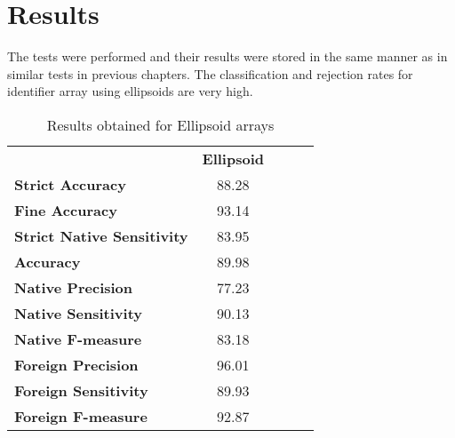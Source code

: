 \section{Results}

The tests were performed and their results were stored in the same manner as in similar tests in previous chapters. The classification and rejection rates for identifier array using ellipsoids are very high.

\begin{table}[htp]
	\centering
	\caption{Results obtained for Ellipsoid arrays}
	\label{ellipsoid_arrays_results}
	\begin{tabular}{l|c|lll}
		\cline{2-2}
		& \multicolumn{1}{l|}{\textbf{Ellipsoid}} &  &  &  \\ \cline{1-2}
		\multicolumn{1}{|l|}{\textbf{Strict Accuracy}}           & 88.28 \\ \cline{1-2}
		\multicolumn{1}{|l|}{\textbf{Fine Accuracy}}             & 93.14 \\ \cline{1-2}
		\multicolumn{1}{|l|}{\textbf{Strict Native Sensitivity}} & 83.95 \\ \cline{1-2}
		\multicolumn{1}{|l|}{\textbf{Accuracy}}                  & 89.98 \\ \cline{1-2}
		\multicolumn{1}{|l|}{\textbf{Native Precision}}          & 77.23 \\ \cline{1-2}
		\multicolumn{1}{|l|}{\textbf{Native Sensitivity}}        & 90.13 \\ \cline{1-2}
		\multicolumn{1}{|l|}{\textbf{Native F-measure}}          & 83.18 \\ \cline{1-2}
		\multicolumn{1}{|l|}{\textbf{Foreign Precision}}         & 96.01 \\ \cline{1-2}
		\multicolumn{1}{|l|}{\textbf{Foreign Sensitivity}}       & 89.93 \\ \cline{1-2}
		\multicolumn{1}{|l|}{\textbf{Foreign F-measure}}         & 92.87 \\ \cline{1-2}
	\end{tabular}
\end{table}
